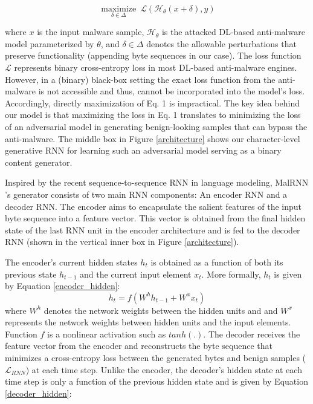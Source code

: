 \documentclass[letterpaper]{article}
\newcommand{\malrnn}{M\lowercase{a}lRNN }
\begin{document}
\begin{equation}
  \underset{\delta \in \Delta}{\operatorname{maximize}}\  \mathcal{L}(\mathcal{H}_\theta(x+\delta),y)
\end{equation}

where $x$ is the input malware sample, $\mathcal{H_\theta}$ is the attacked DL-based anti-malware model parameterized by $\theta$, and $\delta \in \Delta$ denotes the allowable perturbations that preserve functionality (appending byte sequences in our case). The loss function $\mathcal{L}$ represents binary cross-entropy loss in most DL-based anti-malware engines. However, in a (binary) black-box setting the exact loss function from the anti-malware is not accessible and thus, cannot be incorporated into the model's loss. Accordingly, directly maximization of Eq. 1 is impractical. The key idea behind our model is that maximizing the loss in Eq. 1 translates to minimizing the loss of an adversarial model in generating benign-looking samples that can bypass the anti-malware. The middle box in Figure \ref{architecture} shows our character-level generative RNN for learning such an adversarial model serving as a binary content generator.

Inspired by the recent sequence-to-sequence RNN in language modeling, \malrnn's generator consists of two main RNN components: An encoder RNN and a decoder RNN. The encoder aims to encapsulate the salient features of the input byte sequence into a feature vector. This vector is obtained from the final hidden state of the last RNN unit in the encoder architecture and is fed to the decoder RNN (shown in the vertical inner box in Figure \ref{architecture}).

The encoder's current hidden states $h_t$ is obtained as a function of both its previous state $h_{t-1}$ and the current input element $x_t$. More formally, $h_t$ is given by Equation \ref{encoder_hidden}:
\begin{equation}
  h_t = f(W^{h}h_{t-1} + W^{x}x_t)
  \label {encoder_hidden}
\end{equation}
where $W^{h}$ denotes the network weights between the hidden units and and $W^{x}$ represents the network weights between hidden units and the input elements. Function $f$ is a nonlinear activation such as $tanh(.)$. The decoder receives the feature vector from the encoder and reconstructs the byte sequence that minimizes a cross-entropy loss between the generated bytes and benign samples ($\mathcal{L}_{RNN}$) at each time step. Unlike the encoder, the decoder's hidden state at each time step is only a function of the previous hidden state and is given by Equation \ref{decoder_hidden}:
\end{document}
